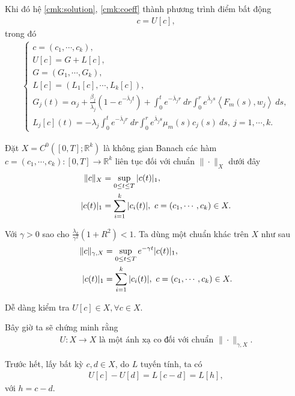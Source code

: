 \documentclass[12pt,a4paper]{article}
\def\R{\mathbb{R}}
\theoremstyle{definition}
\theoremstyle{definition}
\begin{document}
Khi đó hệ \eqref{cmk:solution}, \eqref{cmk:coeff} thành phương trình điểm bất động
\begin{align}
    c = U[c],
\end{align}
trong đó
\begin{align}
\begin{cases}
    c = (c_1,\cdots,c_k), \\
    U[c] = G + L[c], \\
    G = (G_1, \cdots, G_k), \\
    L[c] = (L_1[c], \cdots, L_k[c]), \\
    \displaystyle G_j(t) = \alpha_j + \frac{\beta_j}{\overline{\lambda}_j}\left(1 - e^{-\overline{\lambda}_j t}\right) + \int_0^t e^{-\overline{\lambda}_j r} \: dr \int_0^r e^{\overline{\lambda}_j s}\left<F_m(s), w_j\right> \: ds, \\
    \displaystyle L_j[c](t) = -\lambda_j \int_0^t e^{-\overline{\lambda}_j r} \: dr \int_0^r e^{\overline{\lambda}_j s} \mu_m(s) c_j(s) \: ds,\  j = 1,\cdots,k.
\end{cases}
\end{align}

Đặt $X = C^0([0,T]; \R^k)$ là không gian Banach các hàm $c = (c_1, \cdots, c_k) \colon [0,T] \to \R^k$ liên tục đối với chuẩn $\|\cdot\|_X$ dưới đây
\begin{align}
    \|c\|_X &= \sup_{0\le t\le T} |c(t)|_1, \\
    |c(t)|_1 &= \sum_{i=1}^k |c_i(t)|, \ c = (c_1, \cdots, c_k) \in X. \notag
\end{align}

Với $\gamma > 0$ sao cho $\frac{\lambda_k}{\gamma^2}(1+R^2) < 1$. Ta dùng một chuẩn khác trên $X$ như sau
\begin{align}
    \|c\|_{\gamma,X} &= \sup_{0 \le t \le T} e^{-\gamma t} |c(t)|_1, \\
    |c(t)|_1 &= \sum_{i=1}^k |c_i(t)|, \  c = (c_1, \cdots, c_k) \in X. \notag
\end{align}

Dễ dàng kiểm tra $U[c] \in X, \forall c \in X$.

Bây giờ ta sẽ chứng minh rằng
\begin{align*}
    U \colon X \to X \text{ là một ánh xạ co đối với chuẩn } \|\cdot\|_{\gamma,X}.
\end{align*}

Trước hết, lấy bất kỳ $c,d \in X$, do $L$ tuyến tính, ta có
\begin{align}
    U[c] - U[d] = L[c - d] = L[h],
\end{align}
với $h = c - d$.
\end{document}
